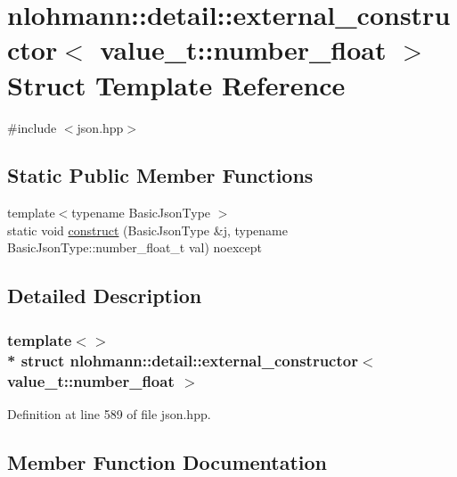 \hypertarget{structnlohmann_1_1detail_1_1external__constructor_3_01value__t_1_1number__float_01_4}{}\section{nlohmann\+:\+:detail\+:\+:external\+\_\+constructor$<$ value\+\_\+t\+:\+:number\+\_\+float $>$ Struct Template Reference}
\label{structnlohmann_1_1detail_1_1external__constructor_3_01value__t_1_1number__float_01_4}


{\ttfamily \#include $<$json.\+hpp$>$}

\subsection*{Static Public Member Functions}
\begin{DoxyCompactItemize}
\item 
{\footnotesize template$<$typename Basic\+Json\+Type $>$ }\\static void \hyperlink{structnlohmann_1_1detail_1_1external__constructor_3_01value__t_1_1number__float_01_4_a669df5a4d258b588e67f747c6d656cdb}{construct} (Basic\+Json\+Type \&j, typename Basic\+Json\+Type\+::number\+\_\+float\+\_\+t val) noexcept
\end{DoxyCompactItemize}


\subsection{Detailed Description}
\subsubsection*{template$<$$>$\\*
struct nlohmann\+::detail\+::external\+\_\+constructor$<$ value\+\_\+t\+::number\+\_\+float $>$}



Definition at line 589 of file json.\+hpp.



\subsection{Member Function Documentation}
